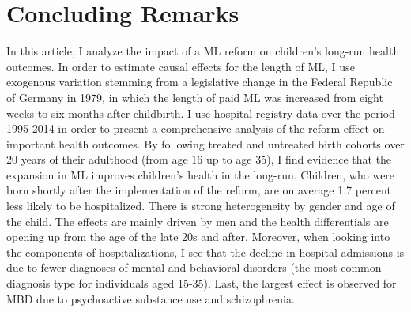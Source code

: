 \documentclass[11pt, a4paper]{article} %
\begin{document}








\section{Concluding Remarks}\label{sec:conclusion}

In this article, I analyze the impact of a ML reform on children's long-run health outcomes. In order to estimate causal effects for the length of ML, I use exogenous variation stemming from a legislative change in the Federal Republic of Germany in 1979, in which the length of paid ML was increased from eight weeks to six months after childbirth. I use hospital registry data over the period 1995-2014 in order to present a comprehensive analysis of the reform effect on important health outcomes. By following treated and untreated birth cohorts over 20 years of their adulthood (from age 16 up to age 35), I find evidence that the expansion in ML improves children's health in the long-run. Children, who were born shortly after the implementation of the reform, are on average 1.7 percent less likely to be hospitalized. There is strong heterogeneity by gender and age of the child. The effects are mainly driven by men and the health differentials are opening up from the age of the late 20s and after. Moreover, when looking into the components of hospitalizations, I see that the decline in hospital admissions is due to fewer diagnoses of mental and behavioral disorders (the most common diagnosis type for individuals aged 15-35). Last, the largest effect is observed for MBD due to psychoactive substance use and schizophrenia. \newline
\end{document}
